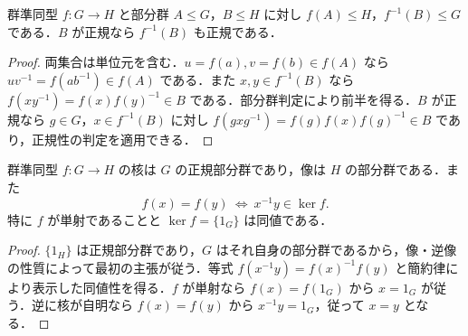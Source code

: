 \begin{prop}[部分群の像と逆像]
群準同型 $f:G\to H$ と部分群 $A\leq G$，$B\leq H$ に対し $f(A)\leq H$，$f^{-1}(B)\leq G$ である．$B$ が正規なら $f^{-1}(B)$ も正規である．
\end{prop}
\begin{proof}
両集合は単位元を含む．$u=f(a),v=f(b)\in f(A)$ なら $uv^{-1}=f(ab^{-1})\in f(A)$ である．また $x,y\in f^{-1}(B)$ なら $f(xy^{-1})=f(x)f(y)^{-1}\in B$ である．部分群判定により前半を得る．$B$ が正規なら $g\in G$，$x\in f^{-1}(B)$ に対し $f(gxg^{-1})=f(g)f(x)f(g)^{-1}\in B$ であり，正規性の判定を適用できる．
\end{proof}
\begin{prop}[核の正規性と単射性]
群準同型 $f:G\to H$ の核は $G$ の正規部分群であり，像は $H$ の部分群である．また
\[
 f(x)=f(y)\ \Longleftrightarrow\ x^{-1}y\in\ker f .
\]
特に $f$ が単射であることと $\ker f=\{1_G\}$ は同値である．
\end{prop}
\begin{proof}
$\{1_H\}$ は正規部分群であり，$G$ はそれ自身の部分群であるから，像・逆像の性質によって最初の主張が従う．等式 $f(x^{-1}y)=f(x)^{-1}f(y)$ と簡約律により表示した同値性を得る．$f$ が単射なら $f(x)=f(1_G)$ から $x=1_G$ が従う．逆に核が自明なら $f(x)=f(y)$ から $x^{-1}y=1_G$，従って $x=y$ となる．
\end{proof}
